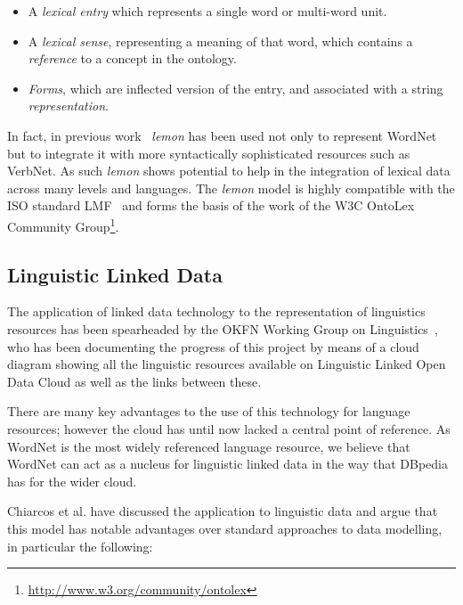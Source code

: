 \documentclass[10pt, a4paper]{article}
\newcommand{\lemon}[0]{\emph{lemon}}
\begin{document}
\begin{itemize}
  \item A \emph{lexical entry} which represents a single word or multi-word
    unit.
  \item A \emph{lexical sense}, representing a meaning of that word, which
    contains a \emph{reference} to a concept in the ontology.
  \item \emph{Forms}, which are inflected version of the entry, and associated
    with a string \emph{representation}.
\end{itemize}

In fact, in previous work~\cite{eckle2014lemonuby} \lemon{} has been used not only to
represent WordNet but to integrate it with more syntactically sophisticated
resources such as VerbNet. As such \lemon{} shows potential to help in the
integration of lexical data across many levels and languages. The \lemon{} model
is highly compatible with the ISO standard LMF~\cite{francopoulo2006lexical} and
forms the basis of the work of the W3C OntoLex Community
Group\footnote{\url{http://www.w3.org/community/ontolex}}.

\subsection{Linguistic Linked Data}

The application of linked data technology to the representation of linguistics
resources has been spearheaded by the OKFN Working Group on Linguistics~\cite{chiarcos2011towards},
who has been documenting the progress of this project by means of a cloud
diagram showing all the linguistic resources available on Linguistic Linked Open Data Cloud as well as the links between these.

There are many key advantages to the use
of this technology for language resources; however the cloud has until now
lacked a central point of reference. As WordNet is the most widely referenced language
resource, we believe that WordNet can act as a nucleus for linguistic linked data
in the way that DBpedia~\cite{auer2007dbpedia} has for the wider cloud.

Chiarcos et al. \cite{chiarcos2013towards} have discussed the
application to linguistic data and argue that this model has notable
advantages over standard approaches to data modelling, in particular the following:
\end{document}
